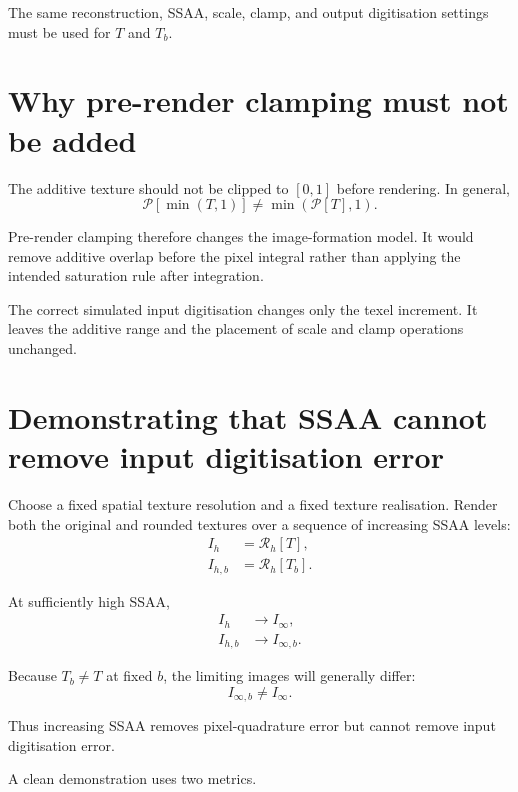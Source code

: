 \documentclass[11pt,a4paper]{article}
\begin{document}
The same reconstruction, SSAA, scale, clamp, and output digitisation settings must be used for $T$ and $T_b$.

\section{Why pre-render clamping must not be added}

The additive texture should not be clipped to $[0,1]$ before rendering. In general,
\begin{equation}
    \mathcal P\!\left[\min(T,1)\right]
    \neq
    \min\!\left(\mathcal P[T],1\right).
\end{equation}

Pre-render clamping therefore changes the image-formation model. It would remove additive overlap before the pixel integral rather than applying the intended saturation rule after integration.

The correct simulated input digitisation changes only the texel increment. It leaves the additive range and the placement of scale and clamp operations unchanged.

\section{Demonstrating that SSAA cannot remove input digitisation error}

Choose a fixed spatial texture resolution and a fixed texture realisation. Render both the original and rounded textures over a sequence of increasing SSAA levels:
\begin{align}
    I_h &= \mathcal R_h[T],\\
    I_{h,b} &= \mathcal R_h[T_b].
\end{align}

At sufficiently high SSAA,
\begin{align}
    I_h &\rightarrow I_{\infty},\\
    I_{h,b} &\rightarrow I_{\infty,b}.
\end{align}

Because $T_b \neq T$ at fixed $b$, the limiting images will generally differ:
\begin{equation}
    I_{\infty,b} \neq I_{\infty}.
\end{equation}

Thus increasing SSAA removes pixel-quadrature error but cannot remove input digitisation error.

A clean demonstration uses two metrics.
\end{document}
